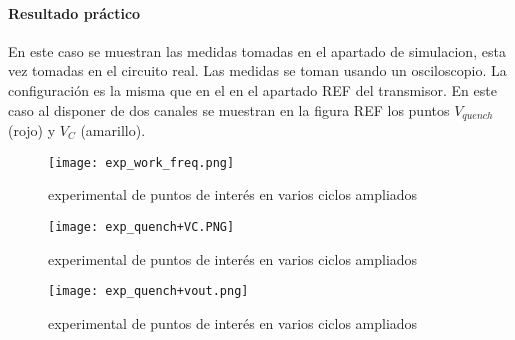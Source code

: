 \paragraph{Resultado práctico} En este caso se muestran las medidas tomadas en el apartado de simulacion, esta vez tomadas en el circuito real. Las medidas se toman usando un osciloscopio. 
La configuración es la misma que en el en el apartado REF del transmisor. En este caso al disponer de dos canales se muestran en la figura REF los puntos $V_{quench}$ (rojo) y $V_{C}$ (amarillo).

\begin{figure}[h!]
    \centering
    \texttt{[image: exp\_work\_freq.png]}
    \caption{experimental de puntos de interés en varios ciclos ampliados}
    \label{fig:simrx_zoom}
\end{figure}
\begin{figure}[h!]
    \centering
    \texttt{[image: exp\_quench+VC.PNG]}
    \caption{experimental de puntos de interés en varios ciclos ampliados}
    \label{fig:simrx_zoom}
\end{figure}
\begin{figure}[h!]
    \centering
    \texttt{[image: exp\_quench+vout.png]}
    \caption{experimental de puntos de interés en varios ciclos ampliados}
    \label{fig:simrx_zoom}
\end{figure}

